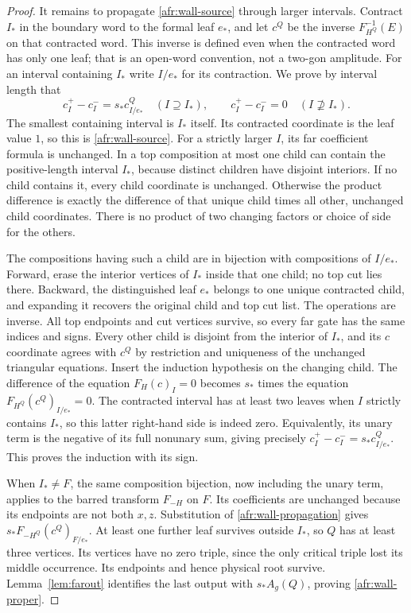 \begin{proof}
It remains to propagate \eqref{afr:wall-source} through larger intervals.
Contract $I_*$ in the boundary word to the formal leaf $e_*$, and let
$c^Q$ be the inverse $F_{H^Q}^{-1}(E)$ on that contracted word.
This inverse is defined even when the contracted word has only one
leaf; that is an open-word convention, not a two-gon amplitude.
For an interval containing $I_*$ write $I/e_*$ for its contraction.
We prove by interval length that
\begin{equation}\label{afr:wall-propagation}
 c^+_I-c^-_I=s_*c^Q_{I/e_*}\quad(I\supseteq I_*),
 \qquad c^+_I-c^-_I=0\quad(I\not\supseteq I_*).
\end{equation}
The smallest containing interval is $I_*$ itself.  Its contracted
coordinate is the leaf value $1$, so this is \eqref{afr:wall-source}.
For a strictly larger $I$, its far coefficient formula is unchanged.
In a top composition at most one child can contain the positive-length
interval $I_*$, because distinct children have disjoint interiors.
If no child contains it, every child coordinate is unchanged.  Otherwise
the product difference is exactly the difference of that unique child
times all other, unchanged child coordinates.  There is no product of
two changing factors or choice of side for the others.

The compositions having such a child are in bijection with compositions
of $I/e_*$.  Forward, erase the interior vertices of $I_*$ inside that
one child; no top cut lies there.  Backward, the distinguished leaf
$e_*$ belongs to one unique contracted child, and expanding it
recovers the original child and top cut list.  The operations are
inverse.  All top endpoints and cut vertices survive, so every far
gate has the same indices and signs.  Every other child is disjoint
from the interior of $I_*$, and its $c$ coordinate agrees with $c^Q$
by restriction and uniqueness of the unchanged triangular equations.
Insert the induction hypothesis on the changing child.  The difference
of the equation $F_H(c)_I=0$ becomes $s_*$ times the equation
$F_{H^Q}(c^Q)_{I/e_*}=0$.  The contracted interval has at least two
leaves when $I$ strictly contains $I_*$, so this latter right-hand
side is indeed zero.  Equivalently, its unary term is the negative
of its full nonunary sum, giving precisely
$c^+_I-c^-_I=s_*c^Q_{I/e_*}$.  This proves the induction with its sign.

When $I_*\ne F$, the same composition bijection, now including the
unary term, applies to the barred transform $F_{-H}$ on $F$.
Its coefficients are unchanged because its endpoints are not both $x,z$.
Substitution of \eqref{afr:wall-propagation} gives
$s_*F_{-H^Q}(c^Q)_{F/e_*}$.  At least one further leaf survives outside
$I_*$, so $Q$ has at least three vertices.  Its vertices have no zero
triple, since the only critical triple lost its middle occurrence.
Its endpoints and hence physical root survive.  Lemma~\ref{lem:farout}
identifies the last output with $s_*A_g(Q)$, proving
\eqref{afr:wall-proper}.


\end{proof}
